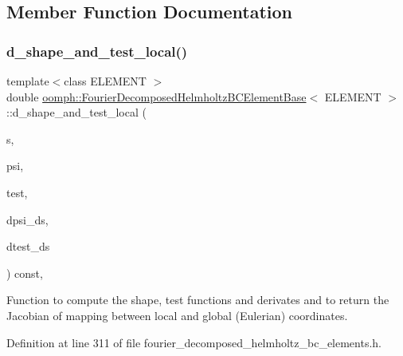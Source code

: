 \subsection{Member Function Documentation}
\mbox{\label{classoomph_1_1FourierDecomposedHelmholtzBCElementBase_a2126f9169af7ef3c8967c0fff4cf1b9e}} 
\subsubsection{\texorpdfstring{d\+\_\+shape\+\_\+and\+\_\+test\+\_\+local()}{d\_shape\_and\_test\_local()}}
{\footnotesize\ttfamily template$<$class E\+L\+E\+M\+E\+NT $>$ \\
double \hyperlink{classoomph_1_1FourierDecomposedHelmholtzBCElementBase}{oomph\+::\+Fourier\+Decomposed\+Helmholtz\+B\+C\+Element\+Base}$<$ E\+L\+E\+M\+E\+NT $>$\+::d\+\_\+shape\+\_\+and\+\_\+test\+\_\+local (\begin{DoxyParamCaption}\item[{const \hyperlink{classoomph_1_1Vector}{Vector}$<$ double $>$ \&}]{s,  }\item[{\hyperlink{classoomph_1_1Shape}{Shape} \&}]{psi,  }\item[{\hyperlink{classoomph_1_1Shape}{Shape} \&}]{test,  }\item[{\hyperlink{classoomph_1_1DShape}{D\+Shape} \&}]{dpsi\+\_\+ds,  }\item[{\hyperlink{classoomph_1_1DShape}{D\+Shape} \&}]{dtest\+\_\+ds }\end{DoxyParamCaption}) const\hspace{0.3cm}{\ttfamily [inline]}, {\ttfamily [protected]}}



Function to compute the shape, test functions and derivates and to return the Jacobian of mapping between local and global (Eulerian) coordinates. 



Definition at line 311 of file fourier\+\_\+decomposed\+\_\+helmholtz\+\_\+bc\+\_\+elements.\+h.



